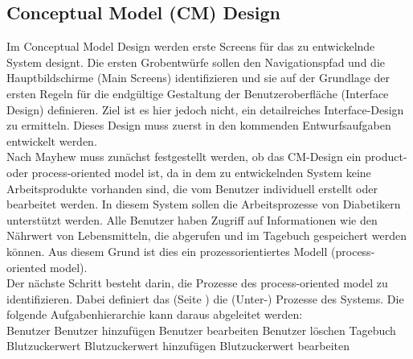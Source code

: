 \subsection{Conceptual Model (CM) Design}
Im Conceptual Model Design werden erste Screens für das zu entwickelnde System designt. Die ersten Grobentwürfe sollen den Navigationspfad und die Hauptbildschirme (Main Screens) identifizieren und sie auf der Grundlage der ersten Regeln für die endgültige Gestaltung der Benutzeroberfläche (Interface Design) definieren. Ziel ist es hier jedoch nicht, ein detailreiches Interface-Design zu ermitteln. Dieses Design muss zuerst in den kommenden Entwurfsaufgaben entwickelt werden.\\
Nach Mayhew \cite{MD} muss zunächst festgestellt werden, ob das CM-Design ein product- oder process-oriented model ist, da in dem zu entwickelnden System keine Arbeitsprodukte vorhanden sind, die vom Benutzer individuell erstellt oder bearbeitet werden. In diesem System sollen die Arbeitsprozesse von Diabetikern unterstützt werden.\newline
Alle Benutzer haben Zugriff auf Informationen wie den Nährwert von Lebensmitteln, die abgerufen und im Tagebuch gespeichert werden können. Aus diesem Grund ist dies ein prozessorientiertes Modell (process-oriented model).\\
Der nächste Schritt besteht darin, die Prozesse des process-oriented model zu identifizieren. Dabei definiert das  (Seite \pageref{img:reengineeredTaskOrganizationModel}) die (Unter-) Prozesse des Systems. Die folgende Aufgabenhierarchie kann daraus abgeleitet werden:\\
Benutzer\newline
\noindent\hspace*{10mm}Benutzer hinzufügen\newline
\noindent\hspace*{10mm}Benutzer bearbeiten\newline
\noindent\hspace*{10mm}Benutzer löschen\newline
Tagebuch\newline
\noindent\hspace*{10mm}Blutzuckerwert\newline
\noindent\hspace*{20mm}Blutzuckerwert hinzufügen\newline
\noindent\hspace*{20mm}Blutzuckerwert bearbeiten\newline
